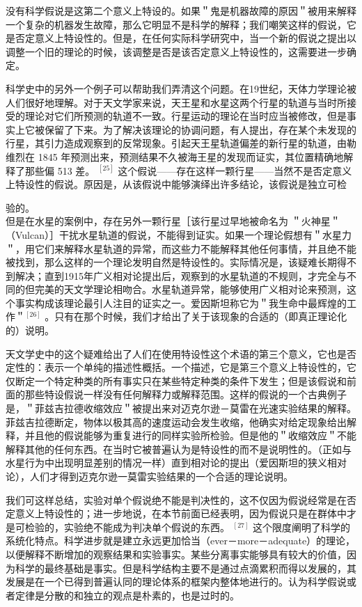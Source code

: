 没有科学假说是这第二个意义上特设的。如果＂鬼是机器故障的原因＂被用来解释一个复杂的机器发生故障，那么它明显不是科学的解释；我们嘲笑这样的假说，它是否定意义上特设性的。但是，在任何实际科学研究中，当一个新的假说之提出以调整一个旧的理论的时候，该调整是否是该否定意义上特设性的，这需要进一步确定。

科学史中的另外一个例子可以帮助我们弄清这个问题。在19世纪，天体力学理论被人们很好地理解。对于天文学家来说，天王星和水星这两个行星的轨道与当时所接受的理论对它们所预测的轨道不一致。行星运动的理论在当时应当被修改，但是事实上它被保留了下来。为了解决该理论的协调问题，有人提出，存在某个未发现的行星，其引力造成观察到的反常现象。引起天王星轨道偏差的新行星的轨道，由勒维烈在 1845 年预测出来，预测结果不久被海王星的发现而证实，其位置精确地解释了那些偏 513 差。 ${ }^{[25]}$ 这个假说——存在这样一颗行星——当然不是否定意义上特设性的假说。原因是，从该假说中能够演绎出许多结论，该假说是独立可检

验的。\\
但是在水星的案例中，存在另外一颗行星［该行星过早地被命名为 ＂火神星＂（Vulcan）］干扰水星轨道的假说，不能得到证实。如果一个理论假想有＂水星力＂，用它们来解释水星轨道的异常，而这些力不能解释其他任何事情，并且绝不能被找到，那么这样的一个理论发明自然是特设性的。实际情况是，该疑难长期得不到解决；直到1915年广义相对论提出后，观察到的水星轨道的不规则，才完全与不同的但完美的天文学理论相吻合。水星轨道异常，能够使用广义相对论来预测，这个事实构成该理论最引人注目的证实之一。爱因斯坦称它为＂我生命中最辉煌的工作＂${ }^{[26]}$ 。只有在那个时候，我们才给出了关于该现象的合适的（即真正理论化的）说明。

天文学史中的这个疑难给出了人们在使用特设性这个术语的第三个意义，它也是否定性的：表示一个单纯的描述性概括。一个描述，它是第三个意义上特设性的，它仅断定一个特定种类的所有事实只在某些特定种类的条件下发生；但是该假说和前面的那些特设假说一样没有任何解释力或解释范围。这样的假说的一个古典例子是，＂菲兹吉拉德收缩效应＂被提出来对迈克尔逊－莫雷在光速实验结果的解释。菲兹吉拉德断定，物体以极其高的速度运动会发生收缩，他确实对给定现象给出解释，并且他的假说能够为重复进行的同样实验所检验。但是他的＂收缩效应＂不能解释其他的任何东西。在当时它被普遍认为是特设性的而不是说明性的。（正如与水星行为中出现明显差别的情况一样）直到相对论的提出（爱因斯坦的狭义相对论），人们才得到迈克尔逊一莫雷实验结果的一个合适的理论说明。

我们可这样总结，实验对单个假说绝不能是判决性的，这不仅因为假说经常是在否定意义上特设性的；进一步地说，在本节前面已经表明，因为假说只是在群体中才是可检验的，实验绝不能成为判决单个假说的东西。 ${ }^{[27]}$ 这个限度阐明了科学的系统化特点。科学进步就是建立永远更加恰当（ever－more－adequate）的理论，以便解释不断增加的观察结果和实验事实。某些分离事实能够具有较大的价值，因为科学的最终基础是事实。但是科学结构主要不是通过点滴累积而得以发展的，其发展是在一个已得到普遍认同的理论体系的框架内整体地进行的。认为科学假说或者定律是分散的和独立的观点是朴素的，也是过时的。

